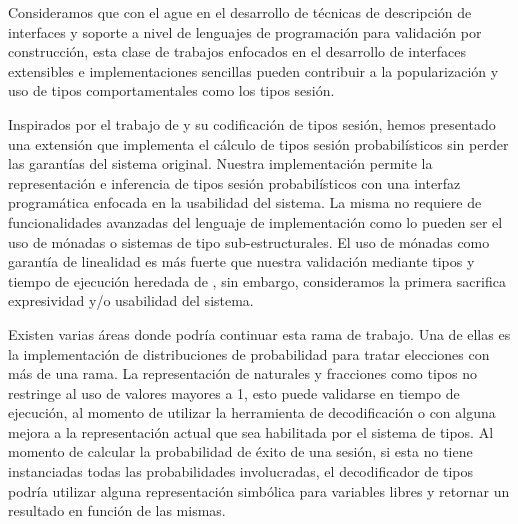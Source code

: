 Consideramos que con el ague en el desarrollo de técnicas de descripción de
interfaces y soporte a nivel de lenguajes de programación para validación por
construcción, esta clase de trabajos enfocados en el desarrollo de interfaces
extensibles e implementaciones sencillas pueden contribuir a la popularización
y uso de tipos comportamentales como los tipos sesión.

Inspirados por el trabajo de \FuSe y su codificación de tipos sesión, hemos
presentado una extensión que implementa el cálculo de tipos sesión
probabilísticos sin perder las garantías del sistema original. Nuestra
implementación permite la representación e inferencia de tipos sesión
probabilísticos con una interfaz programática enfocada en la usabilidad del
sistema. La misma no requiere de funcionalidades avanzadas del lenguaje de
implementación como lo pueden ser el uso de mónadas o sistemas de tipo
sub-estructurales. El uso de mónadas  como
garantía de linealidad es más fuerte que nuestra validación mediante tipos y
tiempo de ejecución heredada de \FuSe, sin embargo, consideramos la primera
sacrifica expresividad y/o usabilidad del sistema.

Existen varias áreas donde podría continuar esta rama de trabajo. Una de ellas
es la implementación de distribuciones de probabilidad para tratar elecciones
con más de una rama. La representación de naturales y fracciones como tipos no
restringe al uso de valores mayores a 1, esto puede validarse en tiempo de
ejecución, al momento de utilizar la herramienta de decodificación o con alguna
mejora a la representación actual que sea habilitada por el sistema de tipos.
Al momento de calcular la probabilidad de éxito de una sesión, si esta no tiene
instanciadas todas las probabilidades involucradas, el decodificador de tipos
podría utilizar alguna representación simbólica para variables libres y
retornar un resultado en función de las mismas.
